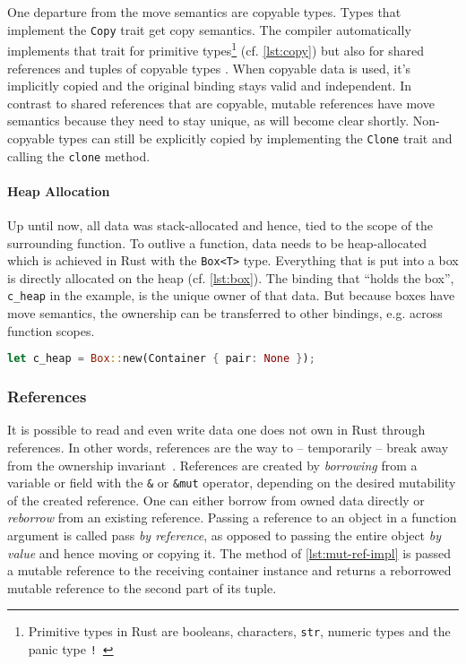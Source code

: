 One departure from the move semantics are copyable types. Types that implement
the \lstinline!Copy! trait get copy semantics. The compiler automatically
implements that trait for primitive types\footnote{Primitive types in Rust are
booleans, characters, \lstinline!str!, numeric types and the panic type
\texttt{!}~\cite{rustref}} (cf. \autoref{lst:copy}) but also for shared
references and tuples of copyable types \cite[section "Special types and
traits"]{rustref}. When copyable data is used, it's implicitly copied and the
original binding stays valid and independent. In contrast to shared references
that are copyable, mutable references have move semantics because they need to
stay unique, as will become clear shortly. Non-copyable types can still be
explicitly copied by implementing the \lstinline!Clone! trait and calling the
\lstinline!clone! method.

\paragraph{Heap Allocation}

Up until now, all data was stack-allocated and hence, tied to the scope of the
surrounding function. To outlive a function, data needs to be heap-allocated
which is achieved in Rust with the \lstinline!Box<T>! type. Everything that is
put into a box is directly allocated on the heap (cf. \autoref{lst:box}). The
binding that ``holds the box'', \lstinline!c_heap! in the example, is the unique
owner of that data. But because boxes have move semantics, the ownership can be
transferred to other bindings, e.g. across function scopes.

\begin{lstlisting}[language=Rust, label=lst:box, caption={A heap-allocated container.}, style=short]
let c_heap = Box::new(Container { pair: None });
\end{lstlisting}

\subsubsection{References}
\label{references}

It is possible to read and even write data one does not own in Rust through
references. In other words, references are the way to -- temporarily -- break
away from the ownership invariant~\cite{lightweight-formalism}. References are
created by \emph{borrowing} from a variable or field with the \lstinline!&! or
\lstinline!&mut! operator, depending on the desired mutability of the created
reference. One can either borrow from owned data directly or \emph{reborrow}
from an existing reference. Passing a reference to an object in a function
argument is called pass \emph{by reference}, as opposed to passing the entire
object \emph{by value} and hence moving or copying it. The method of
\autoref{lst:mut-ref-impl} is passed a mutable reference to the receiving
container instance and returns a reborrowed mutable reference to the second part
of its tuple.

